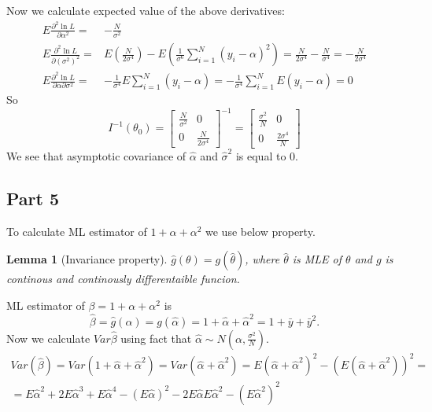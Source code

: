 \documentclass[12pt, a4paper]{article}\usepackage[]{graphicx}\usepackage[]{color}
\newtheorem{lemma}{Lemma}
\begin{document}
Now we calculate expected value of the above derivatives:
\begin{align*}
E\frac{\partial^{2}\ln{L}}{\partial\alpha^{2}}=&-\frac{N}{\sigma^{2}} \\
%
E\frac{\partial^{2}\ln{L}}{\partial(\sigma^{2})^{2}}=&E\left(\frac{N}{2\sigma^{4}}\right)-E\left(\frac{1}{\sigma^{6}}\sum_{i=1}^{N}(y_{i}-\alpha)^{2}\right)=\frac{N}{2\sigma^{4}}-\frac{N}{\sigma^{4}}=-\frac{N}{2\sigma^{4}}\\
%
E\frac{\partial^{2}\ln{L}}{\partial\alpha\partial\sigma^{2}}=&-\frac{1}{\sigma^{4}}E\sum_{i=1}^{N}(y_{i}-\alpha)=-\frac{1}{\sigma^{4}}\sum_{i=1}^{N}E(y_{i}-\alpha)=0
\end{align*}
So 
\[
I^{-1}(\theta_{0})=
\begin{bmatrix}  
    \frac{N}{\sigma^{2}} & 0\\
    0 & \frac{N}{2\sigma^{4}}
  \end{bmatrix}^{-1}=
	\begin{bmatrix}  
    \frac{\sigma^{2}}{N} & 0\\
    0 & \frac{2\sigma^{4}}{N}
  \end{bmatrix}
\]
We see that asymptotic covariance of $\hat{\alpha}$ and $\hat{\sigma}^{2}$ is equal to 0.




\subsection{Part 5}

To calculate ML estimator of $1+\alpha+\alpha^{2}$ we use below property.
%
\begin{lemma}[Invariance property]
$\hat{g}(\theta)=g(\hat{\theta})$, where $\hat{\theta}$ is MLE of $\theta$ and $g$ is continous and continously differentaible funcion.
\end{lemma}
%
ML estimator of $\beta=1+\alpha+\alpha^{2}$ is 
\[\hat{\beta}=\hat{g}(\alpha)=g(\hat{\alpha})=1+\hat{\alpha}+\hat{\alpha}^{2}=1+\bar{y}+\bar{y}^{2}.\]
%
Now we calculate $Var\hat{\beta}$ using fact that $\hat{\alpha}\sim N(\alpha,\frac{\sigma^{2}}{N})$.
%
\begin{gather*}
Var(\hat{\beta})=Var(1+\hat{\alpha}+\hat{\alpha}^{2})=Var(\hat{\alpha}+\hat{\alpha}^{2})=E(\hat{\alpha}+\hat{\alpha}^{2})^{2}-(E(\hat{\alpha}+\hat{\alpha}^{2}))^{2}=\\
=E\hat{\alpha}^{2}+2E\hat{\alpha}^{3}+E\hat{\alpha}^{4}-(E\hat{\alpha})^{2}-2E\hat{\alpha}E\hat{\alpha}^{2}-(E\hat{\alpha}^{2})^{2}
\end{gather*}
\end{document}
